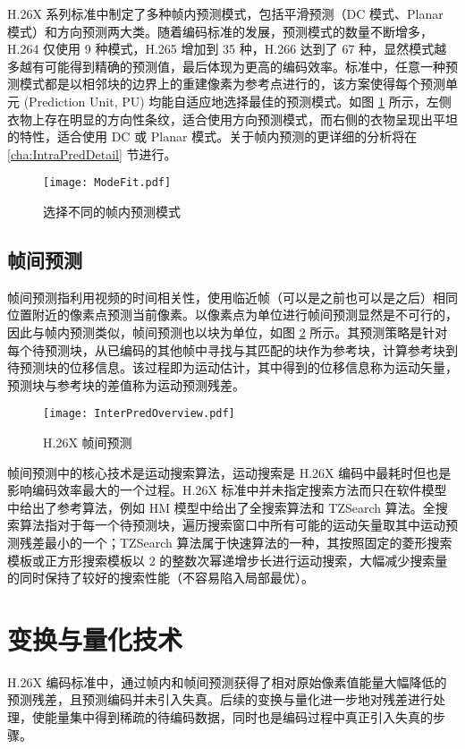 H.26X 系列标准中制定了多种帧内预测模式，包括平滑预测（DC 模式、Planar 模式）和方向预测两大类。随着编码标准的发展，预测模式的数量不断增多，H.264 仅使用 9 种模式，H.265 增加到 35 种，H.266 达到了 67 种，显然模式越多越有可能得到精确的预测值，最后体现为更高的编码效率。标准中，任意一种预测模式都是以相邻块的边界上的重建像素为参考点进行的，该方案使得每个预测单元 (Prediction Unit, PU) 均能自适应地选择最佳的预测模式。如图 \ref{fig:ModeFit} 所示，左侧衣物上存在明显的方向性条纹，适合使用方向预测模式，而右侧的衣物呈现出平坦的特性，适合使用 DC 或 Planar 模式。关于帧内预测的更详细的分析将在 \ref{cha:IntraPredDetail} 节进行。
\begin{figure}[hbt]
    \centering
    \texttt{[image: ModeFit.pdf]}
    \caption{选择不同的帧内预测模式}
    \label{fig:ModeFit}
\end{figure}

\subsection{帧间预测}
帧间预测指利用视频的时间相关性，使用临近帧（可以是之前也可以是之后）相同位置附近的像素点预测当前像素。以像素点为单位进行帧间预测显然是不可行的，因此与帧内预测类似，帧间预测也以块为单位，如图 \ref{fig:InterPredOverview} 所示。其预测策略是针对每个待预测块，从已编码的其他帧中寻找与其匹配的块作为参考块，计算参考块到待预测块的位移信息。该过程即为运动估计，其中得到的位移信息称为运动矢量，预测块与参考块的差值称为运动预测残差。
\begin{figure}[hbt]
    \centering
    \texttt{[image: InterPredOverview.pdf]}
    \caption{H.26X 帧间预测}
    \label{fig:InterPredOverview}
\end{figure}

帧间预测中的核心技术是运动搜索算法，运动搜索是 H.26X 编码中最耗时但也是影响编码效率最大的一个过程。H.26X 标准中并未指定搜索方法而只在软件模型中给出了参考算法，例如 HM 模型中给出了全搜索算法和 TZSearch 算法。全搜索算法指对于每一个待预测块，遍历搜索窗口中所有可能的运动矢量取其中运动预测残差最小的一个；TZSearch 算法属于快速算法的一种，其按照固定的菱形搜索模板或正方形搜索模板以 2 的整数次幂递增步长进行运动搜索，大幅减少搜索量的同时保持了较好的搜索性能（不容易陷入局部最优）。

\section{变换与量化技术}
H.26X 编码标准中，通过帧内和帧间预测获得了相对原始像素值能量大幅降低的预测残差，且预测编码并未引入失真。后续的变换与量化进一步地对残差进行处理，使能量集中得到稀疏的待编码数据，同时也是编码过程中真正引入失真的步骤。

